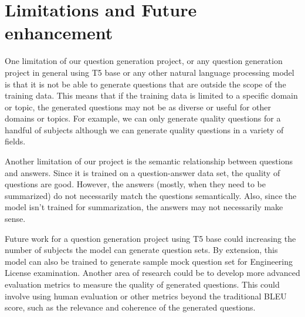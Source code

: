 \documentclass[12pt]{report}
\begin{document}
\chapter{Limitations and Future enhancement}
One limitation of our question generation project, or any question generation project in general using T5 base or any other natural language processing model is that it is not be able to generate questions that are outside the scope of the training data. This means that if the training data is limited to a specific domain or topic, the generated questions may not be as diverse or useful for other domains or topics. For example, we can only generate quality questions for a handful of subjects although we can generate quality questions in a variety of fields.

Another limitation of our project is the semantic relationship between questions and answers. Since it is trained on a question-answer data set, the quality of questions are good. However, the answers (mostly, when they need to be summarized) do not necessarily match the questions semantically. Also, since the model isn't trained for summarization, the answers may not necessarily make sense.   

Future work for a question generation project using T5 base could increasing the number of subjects the model can generate question sets. By extension, this model can also be trained to generate sample mock question set for Engineering License examination. Another area of research could be to develop more advanced evaluation metrics to measure the quality of generated questions. This could involve using human evaluation or other metrics beyond the traditional BLEU score, such as the relevance and coherence of the generated questions. 
\renewcommand{\bibname}{References}


\end{document}
